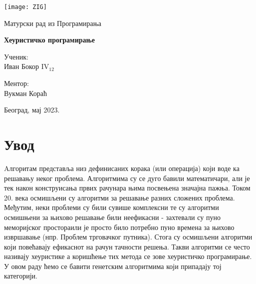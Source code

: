 \documentclass{article}
\begin{document}

\thispagestyle{empty}

\graphicspath{{./images/}}

\begin{center}
    \texttt{[image: ZIG]}
\end{center}

\vspace*{20mm}

\begin{center}
    \Large Матурски рад из Програмирања

    \vspace*{8pt}

    \Huge \textbf{Хеуристичко програмирање}
\end{center}

\vspace*{40mm}

\setlength{\columnsep}{50pt}
\begin{multicols}{2}
 {\noindent \large Ученик:
\\Иван Бокор  IV$_{12}$}

 {\noindent \hfill \large \centering{}Ментор: \\
 \hfill \phantom{111} Вукман Кораћ}

\end{multicols}

\vfill

\begin{center}
    \Large Београд, мај 2023.
\end{center}

\newpage


\tableofcontents


\newpage
{}

\section{Увод}

Aлгоритам представља низ дефинисаних корака (или операција) који воде ка
решавању неког проблема. Алгоритмима су се дуго бавили математичари, али је 
тек након конструисања првих рачунара њима посвењена значајна пажња. Током 
20. века осмишљени су алгоритми за решавање разних сложених проблема.  Међутим,
неки проблеми су били сувише комплексни те су алгоритми осмишњени за њихово
решавање били неефикасни - захтевали су пуно меморијског простораили је просто 
било потребно пуно времена за њихово извршавање (нпр. Проблем трговачког путника).
Стога су осмишљени алгоритми који повећавају ефикаснот на рачун тачности решења.
Такви алгоритми се често називају хеуристике а коришћење тих метода се зове хеуристичко програмирање.
У овом раду ћемо се бавити генетским алгоритмима који припадају тој категорији.
\end{document}
